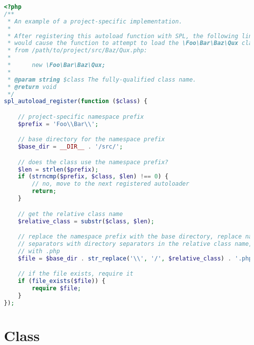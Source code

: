 \begin{lstlisting}[language=PHP]
<?php
/**
 * An example of a project-specific implementation.
 *
 * After registering this autoload function with SPL, the following line
 * would cause the function to attempt to load the \Foo\Bar\Baz\Qux class
 * from /path/to/project/src/Baz/Qux.php:
 *
 *      new \Foo\Bar\Baz\Qux;
 *
 * @param string $class The fully-qualified class name.
 * @return void
 */
spl_autoload_register(function ($class) {

    // project-specific namespace prefix
    $prefix = 'Foo\\Bar\\';

    // base directory for the namespace prefix
    $base_dir = __DIR__ . '/src/';

    // does the class use the namespace prefix?
    $len = strlen($prefix);
    if (strncmp($prefix, $class, $len) !== 0) {
        // no, move to the next registered autoloader
        return;
    }

    // get the relative class name
    $relative_class = substr($class, $len);

    // replace the namespace prefix with the base directory, replace namespace
    // separators with directory separators in the relative class name, append
    // with .php
    $file = $base_dir . str_replace('\\', '/', $relative_class) . '.php';

    // if the file exists, require it
    if (file_exists($file)) {
        require $file;
    }
});
\end{lstlisting}

\section{Class}




